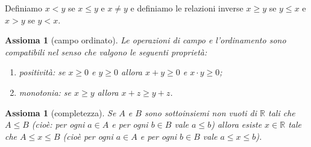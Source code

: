 \documentclass[italian,a4paper,oneside,headinclude]{scrbook}
\newcommand{\RR}{\mathbb R}
\newtheorem{axiom}[theorem]{Assioma}
\begin{document}
Definiamo $x<y$ se $x\le y$ e $x \neq y$ e definiamo le relazioni
inverse $x \ge y$ se $y\le x$ e $x>y$ se $y<x$.

\begin{axiom}[campo ordinato]
Le operazioni di campo e l'ordinamento sono compatibili nel senso che
valgono le seguenti proprietà:
\begin{enumerate}
\item positività: se $x\ge 0$ e $y \ge 0$ allora $x+y \ge 0$ e $x\cdot y\ge 0$;
\item monotonia: se $x \ge y$ allora $x+z \ge y+z$.
\end{enumerate}
\end{axiom}

\begin{axiom}[completezza]\label{axiom_complete}
Se $A$ e $B$ sono sottoinsiemi non vuoti di $\RR$ tali che $A \le B$
(cioè: per ogni $a \in A$ e per ogni $b\in B$ vale $a\le b$) allora esiste
$x\in \RR$ tale che $A\le x \le B$ (cioè per ogni $a\in A$ e per ogni $b\in B$
vale $a\le x \le b$).
\end{axiom}
\end{document}
